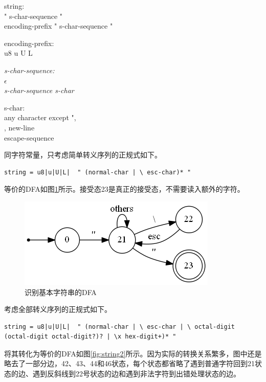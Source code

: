 \documentclass[UTF8, twoside, titlepage]{ctexart}
\newenvironment{lex}
{
	\linespread{1.2}
	\leftskip=2.5cm
	\rightskip=2.5cm
	\itshape
	\setlength{\parindent}{-1cm}
}
{\par}
\begin{document}
\begin{lex}
string:\\
	" s-char-sequence "  \\
	encoding-prefix " s-char-sequence "
	
encoding-prefix: \\
{
	\normalfont
	\ttfamily
	u8 u U L
}

\itshape
s-char-sequence:\\
	$\epsilon$  \\
	s-char-sequence s-char
	
s-char:\\
	any character except ", \\, new-line \\
	escape-sequence
\end{lex}

同字符常量，只考虑简单转义序列的正规式如下。

\begin{lstlisting}
string = u8|u|U|L|  " (normal-char | \ esc-char)* "
\end{lstlisting}

等价的DFA如图\ref{fig:string}所示。接受态23是真正的接受态，不需要读入额外的字符。

\begin{figure}[htbp]
	\centering
	\includegraphics[scale=0.54]{images/string.png}
	\caption{识别基本字符串的DFA}
	\label{fig:string}
\end{figure}

考虑全部转义序列的正规式如下。

\begin{lstlisting}
string = u8|u|U|L|  " (normal-char | \ esc-char | \ octal-digit (octal-digit octal-digit?)? | \x hex-digit+)* "
\end{lstlisting}

将其转化为等价的DFA如图\ref{fig:string2}所示。因为实际的转换关系繁多，图中还是略去了一部分边，42、43、44和46状态，每个状态都省略了遇到普通字符回到21状态的边、遇到反斜线到22号状态的边和遇到非法字符到出错处理状态的边。
\end{document}
